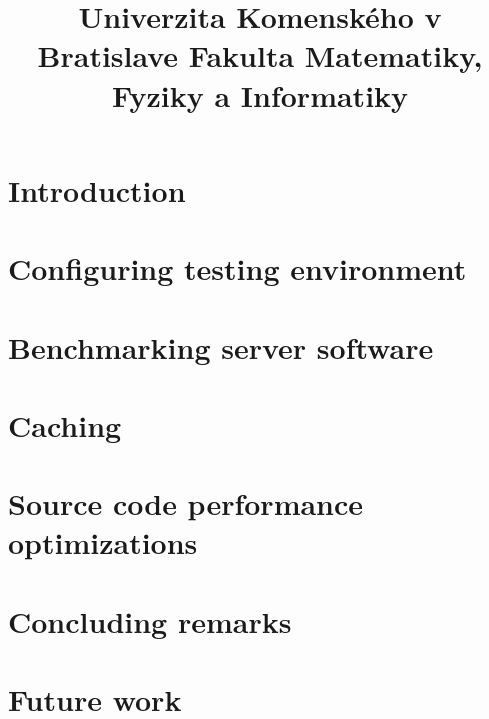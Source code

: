 \documentclass[12pt,a4paper]{bachelor}
\title{Univerzita Komenského v Bratislave Fakulta Matematiky, Fyziky a Informatiky}
\author{\autor}
\begin{document}



\printglossaries


\tableofcontents
\listoffigures

\newpage


\chapter{Introduction}


\chapter{Configuring testing environment}


\chapter{Benchmarking server software}


\chapter{Caching}


\chapter{Source code performance optimizations}


\chapter{Concluding remarks}


\chapter{Future work}


\printbibliography
{}

\label{totalpages}
\end{document}

